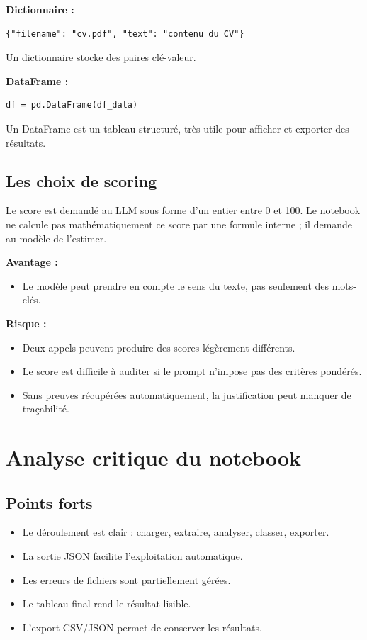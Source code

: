 \documentclass[12pt,a4paper]{article}
\begin{document}
\textbf{Dictionnaire :}
\begin{lstlisting}[style=pythonstyle]
{"filename": "cv.pdf", "text": "contenu du CV"}
\end{lstlisting}
Un dictionnaire stocke des paires clé-valeur.

\textbf{DataFrame :}
\begin{lstlisting}[style=pythonstyle]
df = pd.DataFrame(df_data)
\end{lstlisting}
Un DataFrame est un tableau structuré, très utile pour afficher et exporter des résultats.

\subsection{Les choix de scoring}

Le score est demandé au LLM sous forme d'un entier entre 0 et 100. Le notebook ne calcule pas mathématiquement ce score par une formule interne ; il demande au modèle de l'estimer.

\textbf{Avantage :}
\begin{itemize}
  \item Le modèle peut prendre en compte le sens du texte, pas seulement des mots-clés.
\end{itemize}

\textbf{Risque :}
\begin{itemize}
  \item Deux appels peuvent produire des scores légèrement différents.
  \item Le score est difficile à auditer si le prompt n'impose pas des critères pondérés.
  \item Sans preuves récupérées automatiquement, la justification peut manquer de traçabilité.
\end{itemize}

\section{Analyse critique du notebook}

\subsection{Points forts}

\begin{itemize}
  \item Le déroulement est clair : charger, extraire, analyser, classer, exporter.
  \item La sortie JSON facilite l'exploitation automatique.
  \item Les erreurs de fichiers sont partiellement gérées.
  \item Le tableau final rend le résultat lisible.
  \item L'export CSV/JSON permet de conserver les résultats.
\end{itemize}
\end{document}
